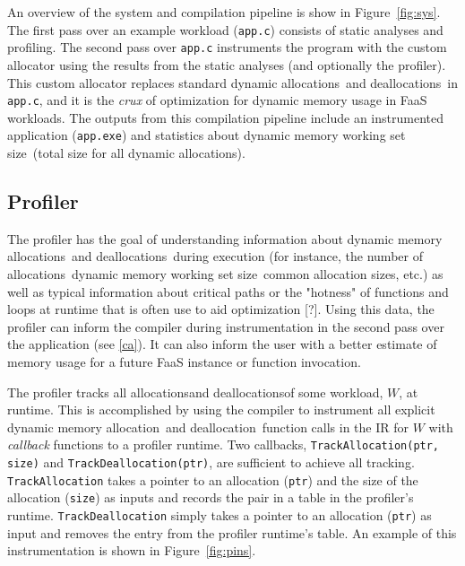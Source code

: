 \documentclass{article}
\def\ALL{allocation}
\def\DALL{deallocation}
\def\ALLS{allocations}
\def\DALLS{deallocations}
\def\DWS{dynamic memory working set size}
\begin{document}
An overview of the system and compilation pipeline is show in Figure~\ref{fig:sys}. The 
first pass over an example workload (\texttt{app.c}) consists of static analyses and 
profiling. The second pass over \texttt{app.c} instruments the program with the custom
allocator using the results from the static analyses (and optionally the profiler). This 
custom allocator replaces standard dynamic \ALLS\ and \DALLS\ in \texttt{app.c}, and it is
the \textit{crux} of optimization for dynamic memory usage in FaaS workloads. The
outputs from this compilation pipeline include an instrumented application (\texttt{app.exe})
and statistics about \DWS\ (total size for all dynamic \ALLS).

\subsection{Profiler} \label{prof}
The profiler has the goal of understanding information about dynamic memory \ALLS\ and 
\DALLS\ during execution (for instance, the number of \ALLS\, \DWS\, common \ALL 
sizes, etc.) as well as typical information about critical paths or the "hotness" of functions and
loops at runtime that is often use to aid optimization [?]. Using this data, the profiler can inform the compiler during 
instrumentation in the second pass over the application (see \ref{ca}). It can also 
inform the user with a better estimate of memory usage for a future FaaS instance or 
function invocation.

The profiler tracks all \ALLS and \DALLS of some workload, $W$, at runtime. This is 
accomplished by using the compiler to instrument all explicit dynamic memory \ALL\ and \DALL\ function 
calls in the IR for $W$ with \textit{callback} functions to a profiler runtime.
Two callbacks, \texttt{TrackAllocation(ptr, size)} and \texttt{TrackDeallocation(ptr)}, are 
sufficient to achieve all tracking. \texttt{TrackAllocation} takes a pointer to an allocation (\texttt{ptr}) and 
the size of the allocation (\texttt{size}) as inputs and records the pair in a table in the 
profiler's runtime. \texttt{TrackDeallocation} simply takes a pointer to an allocation (\texttt{ptr}) as
input and removes the entry from the profiler runtime's table. An example of this 
instrumentation is shown in Figure~\ref{fig:pins}.
\end{document}
